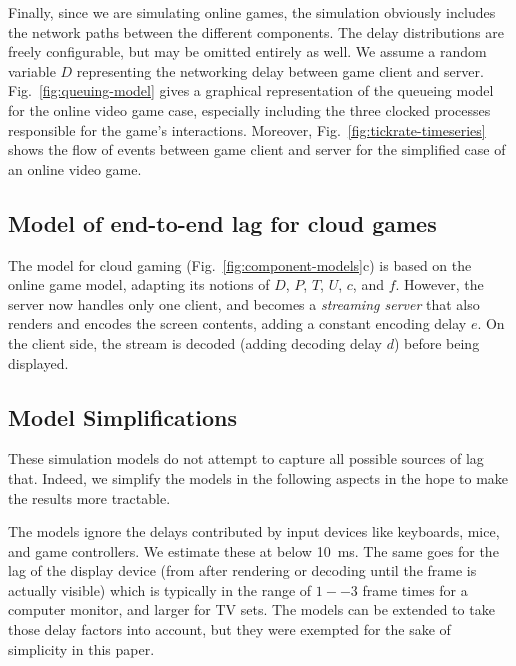 Finally, since we are simulating online games, the simulation obviously includes the network paths between the different components. The delay distributions are freely configurable, but may be omitted entirely as well. We assume a random variable $D$ representing the networking delay between game client and server. Fig.~\ref{fig:queuing-model} gives a graphical representation of the queueing model for the online video game case, especially including the three clocked processes responsible for the game's interactions. Moreover, Fig.~\ref{fig:tickrate-timeseries} shows the flow of events between game client and server for the simplified case of an online video game.



\subsection{Model of end-to-end lag for cloud games}
The model for cloud gaming (Fig.~\ref{fig:component-models}c) is based on the online game model, adapting its notions of $D$, $P$, $T$, $U$, $c$, and $f$. However, the server now handles only one client, and becomes a \textit{streaming server} that also renders and encodes the screen contents, adding a constant encoding delay $e$. On the client side, the stream is decoded (adding decoding delay $d$) before being displayed.



\subsection{Model Simplifications}

These simulation models do not attempt to capture all possible sources of lag that. Indeed, we simplify the models in the following aspects in the hope to make the results more tractable.

The models ignore the delays contributed by input devices like keyboards, mice, and game controllers. We estimate these at below \SI{10}{\milli\second}. The same goes for the lag of the display device (from after rendering or decoding until the frame is actually visible) which is typically in the range of $1--3$ frame times for a computer monitor, and larger for TV sets. The models can be extended to take those delay factors into account, but they were exempted for the sake of simplicity in this paper.

